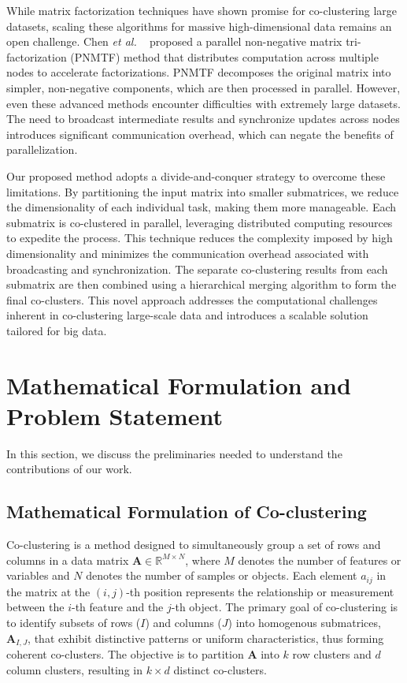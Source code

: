 \documentclass[journal]{IEEEtran}
\renewcommand{\cite}[1]{~\autocite{#1}}
\begin{document}
While matrix factorization techniques have shown promise for co-clustering large datasets, scaling these algorithms for massive high-dimensional data remains an open challenge. Chen \textit{et al.} \cite{chen2023ParallelNonNegativeMatrix} proposed a parallel non-negative matrix tri-factorization (PNMTF) method that distributes computation across multiple nodes to accelerate factorizations. PNMTF decomposes the original matrix into simpler, non-negative components, which are then processed in parallel. However, even these advanced methods encounter difficulties with extremely large datasets. The need to broadcast intermediate results and synchronize updates across nodes introduces significant communication overhead, which can negate the benefits of parallelization.

Our proposed method adopts a divide-and-conquer strategy to overcome these limitations. By partitioning the input matrix into smaller submatrices, we reduce the dimensionality of each individual task, making them more manageable. Each submatrix is co-clustered in parallel, leveraging distributed computing resources to expedite the process. This technique reduces the complexity imposed by high dimensionality and minimizes the communication overhead associated with broadcasting and synchronization. The separate co-clustering results from each submatrix are then combined using a hierarchical merging algorithm to form the final co-clusters. This novel approach addresses the computational challenges inherent in co-clustering large-scale data and introduces a scalable solution tailored for big data.

\section{Mathematical Formulation and Problem Statement}\label{sec:formula}

In this section, we discuss the preliminaries needed to understand the contributions of our work.

\subsection{Mathematical Formulation of Co-clustering}
Co-clustering is a method designed to simultaneously group a set of rows and columns in a data matrix $\mathbf{A} \in \mathbb{R}^{M \times N}$, where $M$ denotes the number of features or variables and $N$ denotes the number of samples or objects. Each element $a_{ij}$ in the matrix at the $(i, j)$-th position represents the relationship or measurement between the $i$-th feature and the $j$-th object. The primary goal of co-clustering is to identify subsets of rows ($I$) and columns ($J$) into homogenous submatrices, $\mathbf{A}_{I, J}$, that exhibit distinctive patterns or uniform characteristics, thus forming coherent co-clusters. The objective is to partition $\mathbf{A}$ into $k$ row clusters and $d$ column clusters, resulting in $k \times d$ distinct co-clusters.
\end{document}
